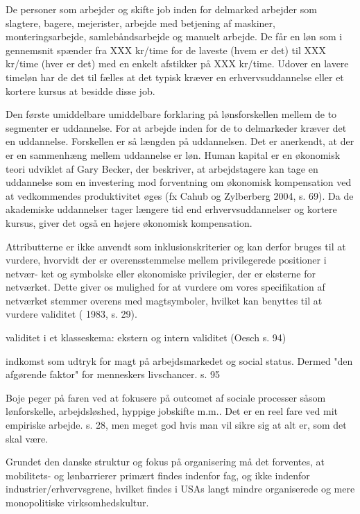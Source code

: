De personer som arbejder og skifte job inden for delmarked  arbejder som slagtere, bagere, mejerister, arbejde med betjening af maskiner, monteringsarbejde, samlebåndsarbejde og manuelt arbejde. De får en løn som i gennemsnit spænder fra XXX kr/time for de laveste (hvem er det) til XXX kr/time (hver er det) med en enkelt afstikker på XXX kr/time. Udover en lavere timeløn har de det til fælles at det typisk kræver en erhvervsuddannelse eller et kortere kursus at besidde disse job.

Den første umiddelbare umiddelbare forklaring på lønsforskellen mellem de to segmenter er uddannelse. For at arbejde inden for de to delmarkeder kræver det en uddannelse. Forskellen er så længden på uddannelsen. Det er anerkendt, at der er en sammenhæng mellem uddannelse er løn. Human kapital er en økonomisk teori udviklet af Gary Becker, der beskriver, at arbejdstagere kan tage en uddannelse som en investering mod forventning om økonomisk kompensation ved at vedkommendes produktivitet øges (fx Cahub og Zylberberg 2004, s. 69). Da de akademiske uddannelser tager længere tid end erhvervsuddannelser og kortere kursus, giver det også en højere økonomisk kompensation. 





Attributterne er ikke anvendt som inklusionskriterier og kan derfor bruges til at
vurdere, hvorvidt der er overensstemmelse mellem privilegerede positioner i netvær-
ket og symbolske eller økonomiske privilegier, der er eksterne for netværket. Dette giver
os mulighed for at vurdere om vores specifikation af netværket stemmer overens med
magtsymboler, hvilket kan benyttes til at vurdere validitet ( 1983, s. 29).


validitet i et klasseskema: ekstern og intern validitet (Oesch s. 94)

indkomst som udtryk for magt på arbejdsmarkedet og social status. Dermed "den afgørende faktor" for menneskers livschancer. s. 95

Boje peger på faren ved at fokusere på outcomet af sociale processer såsom lønforskelle, arbejdsløshed, hyppige jobskifte m.m.. Det er en reel fare ved mit empiriske arbejde. s. 28, men meget god hvis man vil sikre sig at alt er, som det skal være. 

Grundet den danske struktur og fokus på organisering må det forventes, at mobilitets- og lønbarrierer primært findes indenfor fag, og ikke indenfor industrier/erhvervsgrene, hvilket findes i USAs langt mindre organiserede og mere monopolitiske virksomhedskultur. 

